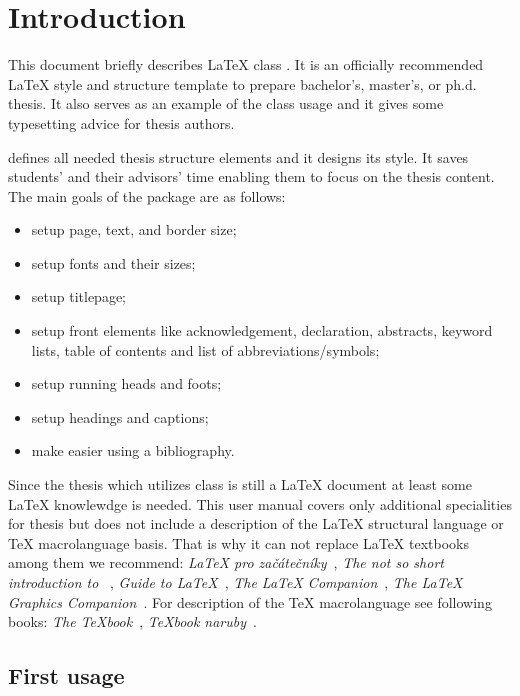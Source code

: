 %

\chapter{Introduction}
This document briefly describes \LaTeX{} class \FelThesis{}. It is
an officially recommended \LaTeX{} style and structure
template to prepare bachelor's, master's, or ph.d. thesis.
It also serves as an example of the class usage and it gives some
typesetting advice for thesis authors.

\FelThesis{} defines all needed thesis structure elements and it designs
its style. It saves students' and their advisors' time enabling them to
focus on the thesis content. The main goals of the package are as follows:
\begin{itemize}
\item setup page, text, and border size;
\item setup fonts and their sizes;
\item setup titlepage;
\item setup front elements like acknowledgement, declaration,
  abstracts, keyword lists, table of contents and list of abbreviations/symbols;
\item setup running heads and foots;
\item setup headings and captions; 
\item make easier using a bibliography.
\end{itemize}

Since the thesis which utilizes \FelThesis{} class is still a \LaTeX{}
document at least some \LaTeX{} knowlewdge is needed. This user manual
covers only additional specialities for thesis but does not include a
description of the \LaTeX{} structural language or \TeX{}
macrolanguage basis. That is why it can not replace \LaTeX{}
textbooks among them we recommend:
\foreignlanguage{czech}{\textit{\LaTeX{} pro začátečníky}}~\cite{Rybicka02},
\textit{The not so short introduction to \LaTeXe{}}~\cite{Oetiker11},
\textit{Guide to LaTeX}~\cite{Kopka04},
\textit{The LaTeX Companion}~\cite{latexcompanion2nd},
\textit{The LaTeX Graphics Companion}~\cite{latexgraphicscompanion2nd}.
For description of the \TeX{} macrolanguage see following books:
\textit{The TeXbook}~\cite{TeXBook},
\foreignlanguage{czech}{\textit{\TeX{}book naruby}}~\cite{Olsak01}.

\section{First usage}
